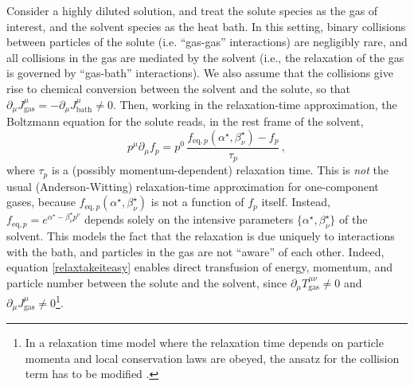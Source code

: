 \documentclass[aps,prd,preprint,nofootinbib,amsmath,amssymb,showpacs,longbibliography,singlecolumn,superscriptaddress,10pt]{revtex4-1}
\theoremstyle{plain}
\theoremstyle{definition}
\begin{document}
Consider a highly diluted solution, and treat the solute species as the gas of interest, and the solvent species as the heat bath. In this setting, binary collisions between particles of the solute (i.e. ``gas-gas'' interactions) are negligibly rare, and all collisions in the gas are mediated by the solvent (i.e., the relaxation of the gas is governed by ``gas-bath'' interactions). We also assume that the collisions give rise to chemical conversion between the solvent and the solute, so that $\partial_\mu J^\mu_{\text{gas}} =-\partial_\mu J^\mu_{\text{bath}} \neq 0$. Then, working in the relaxation-time approximation, the Boltzmann equation for the solute reads, in the rest frame of the solvent, 
\begin{equation}\label{relaxtakeiteasy}
    p^\mu \partial_\mu f_p = p^0 \,  \dfrac{f_{\text{eq},p}(\alpha^\star,\beta^\star_\nu)-f_p}{\tau_p} \, ,
\end{equation}
where $\tau_p$ is a (possibly momentum-dependent) relaxation time. This is \textit{not} the usual (Anderson-Witting) relaxation-time approximation for one-component gases, because $f_{\text{eq},p}(\alpha^\star,\beta^\star_\nu)$ is not a function of $f_p$ itself. Instead, $f_{\text{eq},p}=e^{\alpha^\star-\beta_\nu^\star p^\nu}$ depends solely on the intensive parameters $\{\alpha^\star,\beta^\star_\nu \}$ of the solvent. This models the fact that the relaxation is due uniquely to interactions with the bath, and particles in the gas are not ``aware'' of each other. Indeed, equation \eqref{relaxtakeiteasy} enables direct transfusion of energy, momentum, and particle number between the solute and the solvent, since $\partial_\mu T^{\mu \nu}_{\text{gas}}\neq 0$ and $\partial_\mu J^\mu_{\text{gas}} \neq 0$\footnote{In a relaxation time model where the relaxation time depends on particle momenta and local conservation laws are obeyed, the ansatz for the collision term has to be modified \cite{Rocha:2021zcw, Rocha:2022fqz}.}.
\end{document}
